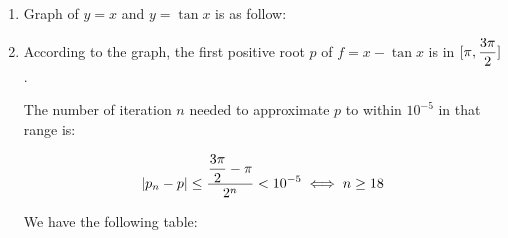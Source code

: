 \documentclass[../../Assignments.tex]{subfiles}
\begin{document}
\begin{exercise}
    \begin{enumerate}[label=(\alph*)]
        \item Graph of \(y = x\) and \(y = \tan{x}\) is as follow:

            \begin{figure}[hbt!]
                \centering
                
            \end{figure}

        \item According to the graph, the first positive root \(p\) of \(f = x -
            \tan{x}\) is in \(\interval{\pi}{\dfrac{3 \pi}{2}}\).

            The number of iteration \(n\) needed to approximate \(p\) to within
            \(10^{-5}\) in that range is:

            \[\abs{p_n - p} \leq \frac{\dfrac{3 \pi}{2} - \pi}{2^n} < 10^{-5} \iff n \geq 18\]

            We have the following table:


\end{enumerate}
\end{exercise}
\end{document}
